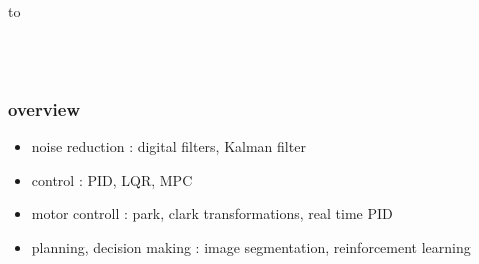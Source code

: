\documentclass{beamer}
\begin{document}
{
    \usebackgroundtemplate
    {
        \vbox to 
    }

    \begin{frame}
     \centering
     {
        \begin{minipage}{10cm}
           {\LARGE \color{white}{\bf algorithms for robotics}} \\
           {\LARGE \color{white}{\bf Michal CHOVANEC, PhD.}} \\
       \end{minipage}
     }

    \end{frame}
}


\begin{frame}
  
  \frametitle{\bf overview}

  \begin{itemize}
    \item noise reduction             : digital filters, Kalman filter
    \item control                     : PID, LQR, MPC
    \item motor controll              : park, clark transformations, real time PID
    \item planning, decision making   : image segmentation, reinforcement learning
  \end{itemize}
    
\end{frame}
\end{document}
